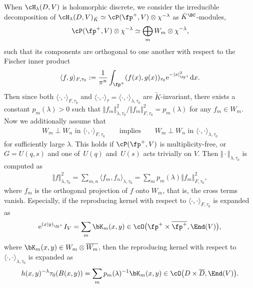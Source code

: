 When $\cH_\lambda(D,V)$ is holomorphic discrete, we consider the irreducible decomposition of \linebreak
$\cH_\lambda(D,V)_{\tilde{K}}\simeq \cP(\fp^+,V)\otimes \chi^{-\lambda}$ as $\tilde{K}^\BC$-modules,
\begin{gather*} \cP(\fp^+,V)\otimes \chi^{-\lambda}\simeq \bigoplus_m W_m\otimes\chi^{-\lambda}, \end{gather*}
such that its components are orthogonal to one another with respect to the Fischer inner product
\begin{gather*} \langle f,g\rangle_{F,\tau_0}:=\frac{1}{\pi^n}\int_{\fp^+} (f(x),g(x) )_{\tau_0}{\rm e}^{-|x|_{\fp^+}^2}{\rm d}x. \end{gather*}
Then since both $\langle \cdot,\cdot\rangle_{F,\tau_0}$ and
$\langle\cdot,\cdot\rangle_{\hat{\tau}}=\langle \cdot,\cdot\rangle_{\lambda,\tau_0}$ are $\tilde{K}$-invariant,
there exists a constant $p_m(\lambda)>0$ such that $\Vert f_m\Vert^2_{\lambda,\tau_0}/\Vert f_m\Vert^2_{F,\tau_0}=p_m(\lambda)$
for any $f_m\in W_m$.
Now we additionally assume that
\begin{gather}\label{assumption_orth}
W_m\perp W_n \text{ in } \langle\cdot,\cdot\rangle_{F,\tau_0}\qquad \text{implies}\qquad
W_m\perp W_n \text{ in } \langle\cdot,\cdot\rangle_{\lambda,\tau_0}
\end{gather}
for sufficiently large $\lambda$.
This holds if $\cP(\fp^+,V)$ is multiplicity-free, or $G=U(q,s)$ and one of~$U(q)$ and~$U(s)$ acts trivially on $V$.
Then $\Vert \cdot\Vert_{\lambda,\tau_0}$ is computed as
\begin{gather}\label{norm_compare}
\Vert f\Vert_{\lambda,\tau_0}^2=\sum_{m,n}\langle f_m,f_n\rangle_{\lambda,\tau_0}=\sum_m p_m(\lambda)\Vert f_m\Vert_{F,\tau_0}^2,
\end{gather}
where $f_m$ is the orthogonal projection of $f$ onto $W_m$, that is, the cross terms vanish.
Especially, if the reproducing kernel with respect to $\langle\cdot,\cdot\rangle_{F,\tau_0}$ is expanded as
\begin{gather*} {\rm e}^{(x|y)_{\fp^+}}I_V=\sum_m \bK_m(x,y)\in\cO\big(\fp^+\times\overline{\fp^+},\End(V)\big), \end{gather*}
where  $\bK_m(x,y)\in W_m\otimes\overline{W_m}$, then the reproducing kernel with respect to $\langle\cdot,\cdot\rangle_{\lambda,\tau_0}$ is expanded as
\begin{gather}\label{kernel_expansion}
h(x,y)^{-\lambda}\tau_0(B(x,y))=\sum_m p_m(\lambda)^{-1}\bK_m(x,y)\in\cO\big(D\times\overline{D},\End(V)\big).
\end{gather}
